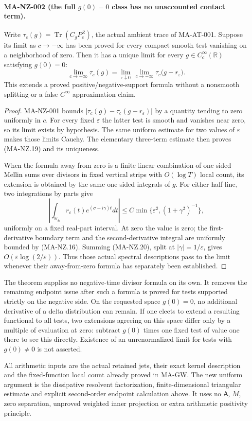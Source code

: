 \paragraph{MA-NZ-002 (the full $g(0)=0$ class has no unaccounted contact term).}
Write $\tau_c(g)=\operatorname{Tr}(C_gP_c^Z)$, the actual
ambient trace of MA-AT-001.
Suppose its limit as $c\to-\infty$ has been proved for
every compact smooth test vanishing on a neighborhood
of zero.  Then it has a unique limit for every
$g\in C_c^\infty(\mathbb R)$ satisfying $g(0)=0$:
\[
 \lim_{c\to-\infty}\tau_c(g)
  =\lim_{\varepsilon\downarrow0}\,\lim_{c\to-\infty}
       \tau_c\bigl(g-r_\varepsilon\bigr).
 \tag{MA-NZ.19}
\]
This extends a proved positive/negative-support formula
without a nonsmooth splitting or a false $C^\infty$
approximation claim.

\begin{proof}
MA-NZ-001 bounds
$|\tau_c(g)-\tau_c(g-r_\varepsilon)|$
by a quantity tending to zero uniformly in $c$.
For every fixed $\varepsilon$ the latter test is
smooth and vanishes near zero, so its limit exists
by hypothesis.  The same uniform estimate for two
values of $\varepsilon$ makes those limits Cauchy.
The elementary three-term estimate then proves
(MA-NZ.19) and its uniqueness.

When the formula away from zero is a finite linear
combination of one-sided Mellin sums over divisors
in fixed vertical strips with $O(\log T)$ local
count, its extension is obtained by the same
one-sided integrals of $g$.
For either half-line, two integrations by parts give
\[
 \left|\int_{\mathbb R_\pm}r_\varepsilon(t)e^{(\sigma+i\gamma)t}dt\right|
   \le C\min\{\varepsilon^2,(1+\gamma^2)^{-1}\},
 \tag{MA-NZ.20}
\]
uniformly on a fixed real-part interval.
At zero the value is zero; the first-derivative
boundary term and the second-derivative integral
are uniformly bounded by (MA-NZ.16).
Summing (MA-NZ.20), split at $|\gamma|=1/\varepsilon$,
gives $O(\varepsilon\log(2/\varepsilon))$.
Thus those actual spectral descriptions pass to
the limit whenever their away-from-zero formula
has separately been established.
\end{proof}

The theorem supplies no negative-time divisor formula
on its own.  It removes the remaining endpoint issue
after such a formula is proved for tests supported
strictly on the negative side.
On the requested space $g(0)=0$, no additional
derivative of a delta distribution can remain.
If one elects to extend a resulting functional to
all tests, two extensions agreeing on this space
differ only by a multiple of evaluation at zero:
subtract $g(0)$ times one fixed test of value one
there to see this directly.  Existence of an
unrenormalized limit for tests with $g(0)\ne0$
is not asserted.

All arithmetic inputs are the actual retained jets,
their exact kernel description and the fixed-function
local count already proved in MA-GW.  The new uniform
argument is the dissipative resolvent factorization,
finite-dimensional triangular estimate and explicit
second-order endpoint calculation above.
It uses no $\mathsf A$, $M$, zero separation,
unproved weighted inner projection or extra
arithmetic positivity principle.
